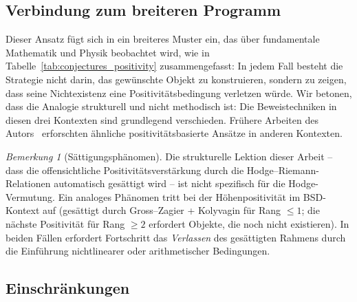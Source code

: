 \documentclass[aps,prd,twocolumn,superscriptaddress,nofootinbib]{revtex4-2}
\theoremstyle{definition}
\theoremstyle{remark}
\newtheorem{remark}[theorem]{Bemerkung}
\begin{document}
\subsection{Verbindung zum breiteren Programm}

Dieser Ansatz fügt sich in ein breiteres Muster ein, das über fundamentale Mathematik und Physik beobachtet wird, wie in Tabelle~\ref{tab:conjectures_positivity} zusammengefasst: In jedem Fall besteht die Strategie nicht darin, das gewünschte Objekt zu konstruieren, sondern zu zeigen, dass seine Nichtexistenz eine Positivitätsbedingung verletzen würde. Wir betonen, dass die Analogie strukturell und nicht methodisch ist: Die Beweistechniken in diesen drei Kontexten sind grundlegend verschieden. Frühere Arbeiten des Autors~\cite{GeigerRH2026c, FST-Unified2026} erforschten ähnliche positivitätsbasierte Ansätze in anderen Kontexten.

\begin{remark}[Sättigungsphänomen]
\label{rem:meta-pattern-saturation}
Die strukturelle Lektion dieser Arbeit -- dass die \glqq offensichtliche\grqq{} Positivitätsverstärkung durch die Hodge--Riemann-Relationen automatisch gesättigt wird -- ist nicht spezifisch für die Hodge-Vermutung. Ein analoges Phänomen tritt bei der Höhenpositivität im BSD-Kontext auf (gesättigt durch Gross--Zagier + Kolyvagin für Rang $\leq 1$; die \glqq nächste\grqq{} Positivität für Rang $\geq 2$ erfordert Objekte, die noch nicht existieren). In beiden Fällen erfordert Fortschritt das \emph{Verlassen} des gesättigten Rahmens durch die Einführung nichtlinearer oder arithmetischer Bedingungen.
\end{remark}

\subsection{Einschränkungen}
\end{document}
